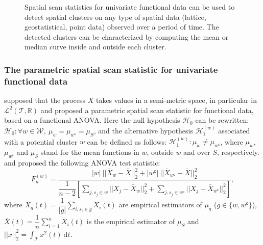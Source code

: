 \begin{figure}[h!]
{Spatial scan statistics for univariate functional data can be used to detect spatial clusters on any type of spatial data (lattice, geostatistical, point data) observed over a period of time. The detected clusters can be characterized by computing the mean or median curve inside and outside each cluster.
}
\label{fig:schema_unifonc}
\end{figure}

\subsubsection{The parametric spatial scan statistic for univariate functional data}

\noindent \citet{notre_fonctionnel} supposed that the process $X$ takes values in a semi-metric space, in particular in $\mathcal{L}^2(\mathcal{T},\mathbb{R})$ and proposed a parametric spatial scan statistic for functional data, based on a functional ANOVA. Here the null hypothesis $\mathcal{H}_0$ can be rewritten: $\mathcal{H}_0: \forall w \in \mathcal{W}, \ \mu_{w} = \mu_{w^\mathsf{c}} = \mu_S$, and the alternative hypothesis $\mathcal{H}_1^{(w)}$ associated with a potential cluster $w$ can be defined as follows: $\mathcal{H}_1^{(w)}: \mu_{w} \neq \mu_{w^\mathsf{c}}$, where $\mu_w$, $\mu_{w^\mathsf{c}}$ and $\mu_S$ stand for the mean functions in $w$, outside $w$ and over $S$, respectively. \citet{anova_functional} and \citet{comparisonanova} proposed the following ANOVA test statistic:
$$
\displaystyle{F_n^{(w)} = \dfrac{
|w| \ ||\bar{X}_{w} - \bar{X}||_2^2 + |w^\mathsf{c}|  \  ||\bar{X}_{w^\mathsf{c}} - \bar{X}||_2^2}{ \dfrac{1}{n-2}
\left[\sum_{j, s_j \in w} ||X_j - \bar{X}_{w}||_2^2 + \sum_{j, s_j \in w^\mathsf{c}} ||X_j - \bar{X}_{w^\mathsf{c}}||_2^2 \right]},}
$$
where $\displaystyle{\bar{X}_{g}(t) = \dfrac{1}{|g|} \sum_{i, s_i \in g} X_i(t)}$ are empirical estimators of $\mu_g$ ($g \in \{w, w^\mathsf{c}\}$), $\displaystyle{\bar{X}(t) = \dfrac{1}{n} \sum_{i = 1}^n X_i(t)}$ is the empirical estimator of $\mu_S$ and $\displaystyle{||x||_2^2 = \int_{\mathcal{T}} x^2(t) \ \text{d}t}$. \\

